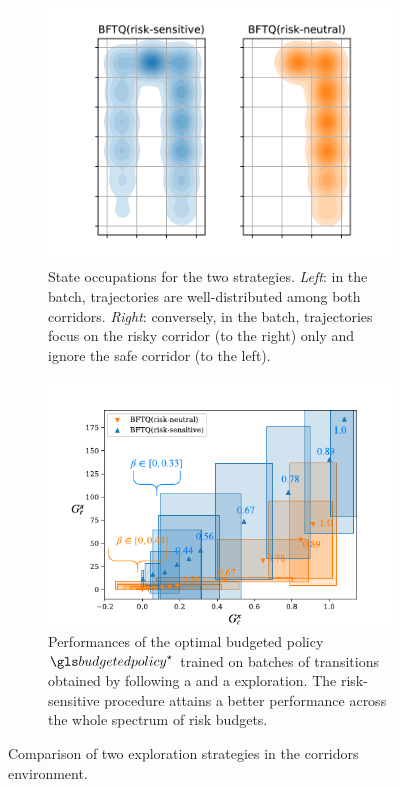 \begin{figure}[tp]
	\centering
	\begin{subfigure}[t]{0.48\linewidth}
		\includegraphics[width=\linewidth]{img/corridors_densities.pdf}
		\caption{State occupations for the two strategies. \emph{Left}: in the  batch, trajectories are well-distributed among both corridors. \emph{Right}: conversely, in the  batch, trajectories focus on the risky corridor (to the right) only and ignore the safe corridor (to the left).}
		\label{fig:exploration-trajs}
	\end{subfigure}\hfill
	\begin{subfigure}[t]{0.48\linewidth}
	    \includegraphics[page=1, width=\textwidth]{img/corridors}
	    \caption{Performances of the optimal budgeted policy $\budgetedpolicy^\star$ trained on batches of transitions obtained by following a  and a  exploration. The risk-sensitive procedure attains a better performance across the whole spectrum of risk budgets.}
	    \label{fig:exploration-perfs}
	\end{subfigure}
	\caption{Comparison of two exploration strategies in the corridors environment. }
	\label{fig:exploration}
\end{figure}


